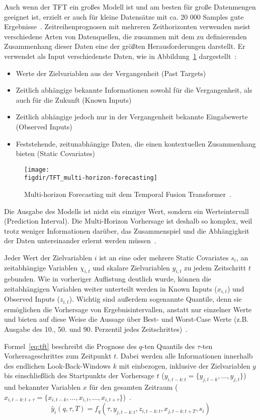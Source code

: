 Auch wenn der \ac{TFT} ein großes Modell ist und am besten für große Datenmengen geeignet ist, erzielt er auch für kleine Datensätze mit ca. 20 000 Samples gute Ergebnisse~\cite{Beitner.2020}.
Zeitreihenprognosen mit mehreren Zeithorizonten verwenden meist verschiedene Arten von Datenquellen, die zusammen mit dem zu definierenden Zusammenhang dieser Daten eine der größten Herausforderungen darstellt.
Er verwendet als Input verschiedenste Daten, wie in Abbildung~\ref{FIG:tft-forecasting} dargestellt~\cite{Lim.19.12.2019}:
\begin{itemize}
 \item Werte der Zielvariablen aus der Vergangenheit (Past Targets)
 \item Zeitlich abhängige bekannte Informationen sowohl für die Vergangenheit, als auch für die Zukunft (Known Inputs)
 \item Zeitlich abhängige jedoch nur in der Vergangenheit bekannte Eingabewerte (Observed Inputs)
 \item Feststehende, zeitunabhängige Daten, die einen kontextuellen Zusammenhang bieten (Static Covariates)
\end{itemize}
\begin{figure}
 \caption{Multi-horizon Forecasting mit dem Temporal Fusion Transformer~\cite{Lim.19.12.2019}.}
 {\texttt{[image: \\figdir/TFT\_multi-horizon-forecasting]}}
 \label{FIG:tft-forecasting}
\end{figure}
Die Ausgabe des Modells ist nicht ein einziger Wert, sondern ein Werteintervall (Prediction Interval).
Die Multi-Horizon Vorhersage ist deshalb so komplex, weil trotz weniger Informationen darüber, das Zusammenspiel und die Abhängigkeit der Daten untereinander erlernt werden müssen~\cite{Lim.19.12.2019}.

Jeder Wert der Zielvariablen $i$ ist an eine oder mehrere Static Covariates $s_i$, an zeitabhängige Variablen $\chi_{i,t}$ und skalare Zielvariablen $y_{i,t}$ zu jedem Zeitschritt $t$ gebunden.
Wie in vorheriger Auflistung deutlich wurde, können die zeitabhängigen Variablen weiter unterteilt werden in Known Inputs ($x_{i,t}$) und Observed Inputs ($z_{i,t}$).
Wichtig sind außerdem sogenannte Quantile, denn sie ermöglichen die Vorhersage von Ergebnisintervallen, anstatt nur einzelner Werte und bieten auf diese Weise die Aussage über Best- und Worst-Case Werte (z.B. Ausgabe des 10., 50. und 90. Perzentil jedes Zeitschrittes)~\cite{Lim.19.12.2019}.

Formel~\ref{eq:tft} beschreibt die Prognose des $q$-ten Quantils des $\tau$-ten Vorhersageschrittes zum Zeitpunkt $t$.
Dabei werden alle Informationen innerhalb des endlichen Look-Back-Windows $k$ mit einbezogen, inklusive der Zielvariablen $y$ bis einschließlich des Startpunkts der Vorhersage $t$ ($y_{i,t-k:t} = \{y_{j,t-k}, \ldots, y_{j,t}\}$) und bekannter Variablen $x$ für den gesamten Zeitraum ($x_{i,t-k:t+\tau} = \{x_{i,t-k}, \ldots, x_{i,t}, \ldots, x_{i,t+\tau}\}$)~\cite{Lim.19.12.2019}.
\begin{equation}
 \label{eq:tft}
 \hat{y}_i(q, \tau, T) = f_q(\tau, y_{j,t-k:t}, z_{i,t-k:t}, x_{j,t-k:t+T}, s_i)
\end{equation}

